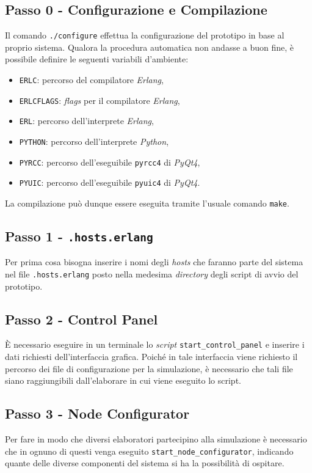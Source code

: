 \documentclass[a4paper]{report}
\newcommand{\Erlang}{\textsl{Erlang}}
\newcommand{\Python}{\textsl{Python}}
\begin{document}
\subsection*{Passo 0 - Configurazione e Compilazione}
Il comando \texttt{./configure} effettua la configurazione del prototipo in base al proprio sistema. Qualora la procedura automatica non andasse a buon fine, è possibile definire le seguenti variabili d'ambiente:
\begin{itemize}
\item \texttt{ERLC}: percorso del compilatore \Erlang{},
\item \texttt{ERLCFLAGS}: \textsl{flags} per il compilatore \Erlang{},
\item \texttt{ERL}: percorso dell'interprete \Erlang{},
\item \texttt{PYTHON}: percorso dell'interprete \Python{},
\item \texttt{PYRCC}: percorso dell'eseguibile \texttt{pyrcc4} di \textsl{PyQt4},
\item \texttt{PYUIC}: percorso dell'eseguibile \texttt{pyuic4} di \textsl{PyQt4}.
\end{itemize}
La compilazione può dunque essere eseguita tramite l'usuale comando \texttt{make}.

\subsection*{Passo 1 - \texttt{.hosts.erlang}}
Per prima cosa bisogna inserire i nomi degli \textit{hosts} che faranno parte del sistema nel file \texttt{.hosts.erlang} posto nella medesima \textsl{directory} degli script di avvio del prototipo.

\subsection*{Passo 2 - Control Panel}
\`E necessario eseguire in un terminale lo \textit{script} \texttt{start\_control\_panel} e inserire i dati richiesti dell'interfaccia grafica.
Poiché in tale interfaccia viene richiesto il percorso dei file di configurazione per la simulazione, è necessario che tali file siano raggiungibili dall'elaborare in cui viene eseguito lo script.

\subsection*{Passo 3 - Node Configurator}
Per fare in modo che diversi elaboratori partecipino alla simulazione è necessario che in ognuno di questi venga eseguito \texttt{start\_node\_configurator}, indicando quante delle diverse componenti del sistema si ha la possibilità di ospitare.
\end{document}

